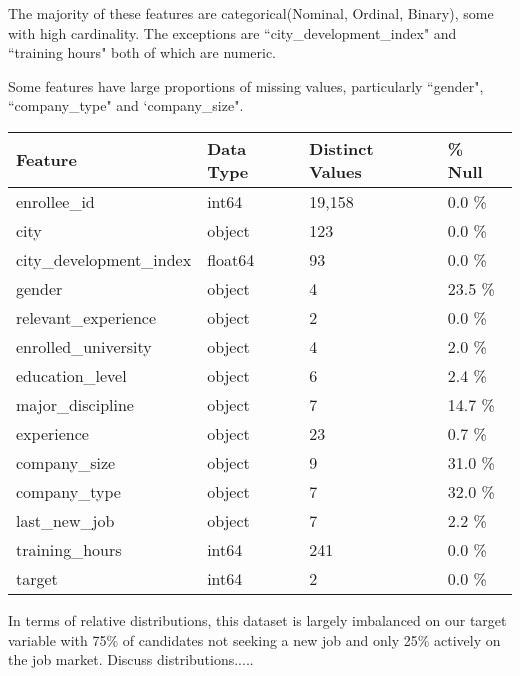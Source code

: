 The majority of these features are categorical(Nominal, Ordinal, Binary), some with high cardinality. The exceptions are ``city\_development\_index" and ``training hours" both of which are numeric. 

Some features have large proportions of missing values, particularly ``gender", ``company\_type" and `company\_size".





\begin{table}[h]
\centering
\begin{tabular}{ |p{4cm}||p{2cm}| p{2.53cm}| p{1.5cm}|}
 \hline
 Feature 		& Data Type	& Distinct Values	& \% Null\\
 \hline
enrollee\_id 	& int64 & 19,158 & 0.0 \%	\\
city			 & object & 123 & 0.0 \% \\
city\_development\_index & float64 & 93 & 0.0 \% \\
gender		& object & 4 & 23.5 \% \\
relevant\_experience & object & 2 & 0.0 \%\\

enrolled\_university & object & 4 & 2.0 \% \\

education\_level & object & 6 & 2.4 \% \\

major\_discipline  & object & 7 & 14.7 \% \\

experience  	& object & 23 & 0.7 \% \\

company\_size 	& object & 9 & 31.0 \% \\

company\_type 	& object & 7 & 32.0 \%\\

last\_new\_job 	& object & 7 & 2.2 \%\\

training\_hours & int64 & 241 & 0.0 \%  \\

target 		 & int64 & 2 & 0.0 \% \\
 \hline
\end{tabular}
\end{table}


In terms of relative distributions, this dataset is largely imbalanced on our target variable with 75\% of candidates not seeking a new job and only 25\% actively on the job market.  Discuss distributions.....



